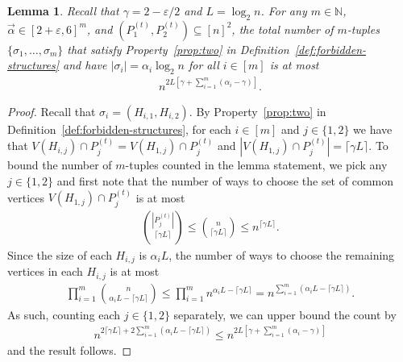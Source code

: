 \documentclass[11pt]{article}
\theoremstyle{plain}
\newtheorem{lemma}{Lemma}
\theoremstyle{definition}
\theoremstyle{remark}
\newcommand{\avec}{\vec{\alpha}}
\newcommand{\N}{\mathbb{N}}
\newcommand{\eps}{\varepsilon}
\begin{document}
\begin{lemma}\label{lem:Z-counting}
    Recall that $\gamma = 2 - \eps/2$ and $L = \log_2 n $. For any $m \in \N$, $\avec \in [2+\eps, 6]^m$, and $\left(P_1^{(t)}, P_2^{(t)}\right) \subseteq [n]^2$, the total number of $m$-tuples $\{\sigma_1, \dots, \sigma_m\}$ that satisfy Property~\ref{prop:two} in Definition~\ref{def:forbidden-structures} and have $|\sigma_i| = \alpha_i \log_2 n$ for all $i \in [m]$ is at most
    \begin{align*}
        n^{2L \left[\gamma + \sum_{i=1}^m(\alpha_i - \gamma)\right]}.
    \end{align*}
\end{lemma}

\begin{proof}
    Recall that $\sigma_i = (H_{i,1}, H_{i,2})$. 
    By Property~\ref{prop:two} in Definition~\ref{def:forbidden-structures}, 
    for each $i \in [m]$ and $j \in \{1,2\}$ 
    we have that $V(H_{i,j}) \cap P_j^{(t)} = V(H_{1,j}) \cap P_j^{(t)}$ and $|V(H_{1,j}) \cap P_j^{(t)}| = \lceil \gamma L\rceil$. To bound the number of $m$-tuples counted in the lemma statement, we pick any $j \in \{1, 2\}$ and first note that the number of ways to choose the set of common vertices $V(H_{1,j}) \cap P_j^{(t)}$ is at most
    \begin{align*}
        \binom{ \left| P_j^{(t)} \right|}{\lceil \gamma L \rceil} 
        \leq \binom{n}{\lceil \gamma L \rceil} 
        \leq n^{\lceil \gamma L \rceil}.
    \end{align*}
    Since the size of each $H_{i,j}$ is $\alpha_i L$, the number of ways to choose the remaining vertices in each $H_{i, j}$ is at most
    \begin{align*}
        \prod_{i=1}^m \binom{n}{\alpha_i L - \lceil \gamma L \rceil} 
        \leq \prod_{i=1}^m n^{\alpha_i L - \lceil \gamma L \rceil} 
        = n^{\sum_{i=1}^m (\alpha_i L - \lceil \gamma L \rceil)}.
    \end{align*}
    As such, counting each $j \in \{1,2\}$ separately, we can upper bound the count by
    \begin{align*}
        n^{2\lceil \gamma L \rceil + 2\sum_{i=1}^m(\alpha_iL - \lceil \gamma L \rceil)} \leq n^{2L[\gamma + \sum_{i=1}^m(\alpha_i - \gamma)]}
    \end{align*}
    and the result follows.
\end{proof}
\end{document}
